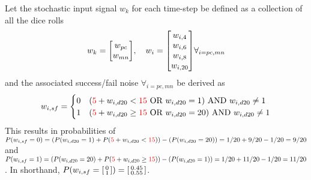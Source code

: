 \documentclass[9pt, onecolumn]{report}
\begin{document}
Let the stochastic input signal $w_k$ for each time-step be defined as a collection of all the dice rolls \[
    w_k = \mqty[w_{pc} \\ w_{mn}], \quad w_{i} = \mqty[w_{i,4} \\ w_{i,6} \\ w_{i,8} \\ w_{i,20}] \forall_{i = pc,mn}
\] and the associated success/fail noise $\forall_{i=pc,mn}$ be derived as \[
    w_{i,sf} = \begin{cases}
        0 & ({\color{red} 5} + w_{i,d20} < {\color{red} 15} \text{ OR } w_{i,d20} = 1) \text{ AND } w_{i,d20} \neq 1\\
        1 & ({\color{red} 5} + w_{i,d20} \geq {\color{red} 15} \text{ OR } w_{i,d20} = 20) \text{ AND } w_{i,d20} \neq 1\\
    \end{cases}
\] 
This results in probabilities of 
$P(w_{i,sf} = 0) = (P(w_{i,d20} = 1) + P({\color{red} 5} + w_{i,d20} < {\color{red} 15})) - (P(w_{i,d20} = 20)) = 1/20 + 9/20 - 1/20 = 9/20$ 
and 
$P(w_{i,sf} = 1) = (P(w_{i,d20} = 20) + P({\color{red} 5} + w_{i,d20} \geq {\color{red} 15})) - (P(w_{i,d20} = 1)) = 1/20 + 11/20 - 1/20 = 11/20$.
In shorthand, $P(w_{i,sf}=\smqty[0\\1]) = \smqty[0.45\\0.55]$.
\end{document}
